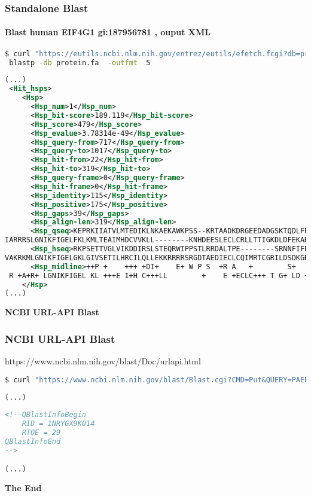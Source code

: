 \documentclass{beamer}
\newcommand{\centeredtitle}[1]{
\begin{center}
    \Huge{\bf{#1}}
\end{center}
}
\newcommand{\hugeslide}[1]{
\begin{frame}
\centeredtitle{#1}
\end{frame}
}
\begin{document}
\begin{frame}[fragile]
\frametitle{Standalone Blast}
\framesubtitle{Blast human EIF4G1 gi:187956781 , ouput XML}
\begin{lstlisting}[language=bash,basicstyle=\tiny,breaklines=true]
$ curl "https://eutils.ncbi.nlm.nih.gov/entrez/eutils/efetch.fcgi?db=protein&rettype=fasta&id=187956781" |\
 blastp -db protein.fa  -outfmt  5
\end{lstlisting}
\begin{lstlisting}[language=xml,basicstyle=\tiny,breaklines=false]
(...)
 <Hit_hsps>
    <Hsp>
      <Hsp_num>1</Hsp_num>
      <Hsp_bit-score>189.119</Hsp_bit-score>
      <Hsp_score>479</Hsp_score>
      <Hsp_evalue>3.78314e-49</Hsp_evalue>
      <Hsp_query-from>717</Hsp_query-from>
      <Hsp_query-to>1017</Hsp_query-to>
      <Hsp_hit-from>22</Hsp_hit-from>
      <Hsp_hit-to>319</Hsp_hit-to>
      <Hsp_query-frame>0</Hsp_query-frame>
      <Hsp_hit-frame>0</Hsp_hit-frame>
      <Hsp_identity>115</Hsp_identity>
      <Hsp_positive>175</Hsp_positive>
      <Hsp_gaps>39</Hsp_gaps>
      <Hsp_align-len>319</Hsp_align-len>
      <Hsp_qseq>KEPRKIIATVLMTEDIKLNKAEKAWKPSS--KRTAADKDRGEEDADGSKTQDLFRRVRSILNKLTPQMFQQLMKQVTQLAIDTEERLKGVIDLIFEKAISEPNFSVAYANMCRCL------MALKVPTTEKPTVTVNFRKLLLNRCQKEFEKDKDDDEVFEKKQKEMDEAATAEERGRLKEELEEARD
IARRRSLGNIKFIGELFKLKMLTEAIMHDCVVKLL--------KNHDEESLECLCRLLTTIGKDLDFEKAKPRMDQYFNQMEKIIKEKKTSSRIRFMLQDVLDLRGSNWVPRRG--DQGPKTIDQIHKEAE</Hsp_qseq>
      <Hsp_hseq>RKPSETTVGLVIKDDIRSLSTEQRWIPPSTLRRDALTPE--------SRNNFIFRKVRGILNKLTPEKFAKLSNDLLNVELNSDVILKGVIFLIFEKALDEPKYSSMYAQLCKRLSDEAANFEPKKALIESQKGQSTFTFLLLSKCRDEFENRSKASEAFENQ----DELGPEEE---------ERRQ
VAKRKMLGNIKFIGELGKLGIVSETILHRCILQLLEKKRRRRSRGDTAEDIECLCQIMRTCGRILDSDKGRGLMDQYFKRMNSLAESRDLPLRIKFMLRDVIELRRDGWVPRKATSTEGPMPINQIRNDNE</Hsp_hseq>
      <Hsp_midline>++P +    +++ +DI+    E+ W P S  +R A   +        S+   +FR+VR ILNKLTP+ F +L   +  + ++++  LKGVI LIFEKA+ EP +S  YA +C+ L         K    E       F  LLL++C+ EFE      E FE +    DE    EE         E
 R +A+R+ LGNIKFIGEL KL +++E I+H C+++LL        +    E +ECLC+++ T G+ LD +K +  MDQYF +M  + + +    RI+FML+DV++LR   WVPR+    +GP  I+QI  + E</Hsp_midline>
    </Hsp>
(...)
\end{lstlisting}
\end{frame}


\hugeslide{NCBI URL-API Blast}

\begin{frame}[fragile]
\frametitle{NCBI URL-API Blast}

https://www.ncbi.nlm.nih.gov/blast/Doc/urlapi.html

\begin{lstlisting}[language=bash,basicstyle=\tiny,breaklines=true]
$ curl "https://www.ncbi.nlm.nih.gov/blast/Blast.cgi?CMD=Put&QUERY=PAERLMERKADIE&DATABASE=nr&PROGRAM=blastp&FILTER=L&HITLIST_SZE=500"
\end{lstlisting}
\begin{lstlisting}[language=html,breaklines=false]
(...)
 
<!--QBlastInfoBegin
    RID = 1NRYGX9K014
    RTOE = 29
QBlastInfoEnd
-->

(...)
\end{lstlisting}
\end{frame}


\hugeslide{The End}
\end{document}

